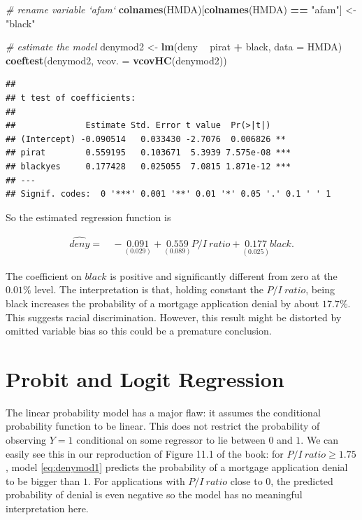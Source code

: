 \documentclass[]{book}
\newenvironment{Shaded}{\begin{snugshade}}{\end{snugshade}}
\newcommand{\KeywordTok}[1]{\textcolor[rgb]{0.13,0.29,0.53}{\textbf{#1}}}
\newcommand{\DataTypeTok}[1]{\textcolor[rgb]{0.13,0.29,0.53}{#1}}
\newcommand{\StringTok}[1]{\textcolor[rgb]{0.31,0.60,0.02}{#1}}
\newcommand{\CommentTok}[1]{\textcolor[rgb]{0.56,0.35,0.01}{\textit{#1}}}
\newcommand{\OperatorTok}[1]{\textcolor[rgb]{0.81,0.36,0.00}{\textbf{#1}}}
\newcommand{\NormalTok}[1]{#1}
\theoremstyle{definition}
\theoremstyle{definition}
\theoremstyle{definition}
\theoremstyle{remark}
\begin{document}
\begin{Shaded}
\begin{Highlighting}[]
\CommentTok{# rename variable `afam`}
\KeywordTok{colnames}\NormalTok{(HMDA)[}\KeywordTok{colnames}\NormalTok{(HMDA) }\OperatorTok{==}\StringTok{ "afam"}\NormalTok{] <-}\StringTok{ "black"}

\CommentTok{# estimate the model}
\NormalTok{denymod2 <-}\StringTok{ }\KeywordTok{lm}\NormalTok{(deny }\OperatorTok{~}\StringTok{ }\NormalTok{pirat }\OperatorTok{+}\StringTok{ }\NormalTok{black, }\DataTypeTok{data =}\NormalTok{ HMDA)}
\KeywordTok{coeftest}\NormalTok{(denymod2, }\DataTypeTok{vcov. =} \KeywordTok{vcovHC}\NormalTok{(denymod2))}
\end{Highlighting}
\end{Shaded}

\begin{verbatim}
## 
## t test of coefficients:
## 
##              Estimate Std. Error t value  Pr(>|t|)    
## (Intercept) -0.090514   0.033430 -2.7076  0.006826 ** 
## pirat        0.559195   0.103671  5.3939 7.575e-08 ***
## blackyes     0.177428   0.025055  7.0815 1.871e-12 ***
## ---
## Signif. codes:  0 '***' 0.001 '**' 0.01 '*' 0.05 '.' 0.1 ' ' 1
\end{verbatim}

So the estimated regression function is

\begin{align}
  \widehat{deny} =& \, -\underset{(0.029)}{0.091} + \underset{(0.089)}{0.559} P/I \ ratio + \underset{(0.025)}{0.177} black. \label{eq:denymod2}
\end{align}

The coefficient on \(black\) is positive and significantly different
from zero at the \(0.01\%\) level. The interpretation is that, holding
constant the \(P/I \ ratio\), being black increases the probability of a
mortgage application denial by about \(17.7\%\). This suggests racial
discrimination. However, this result might be distorted by omitted
variable bias so this could be a premature conclusion.

\section{Probit and Logit Regression}\label{probit-and-logit-regression}

The linear probability model has a major flaw: it assumes the
conditional probability function to be linear. This does not restrict
the probability of observing \(Y=1\) conditional on some regressor to
lie between \(0\) and \(1\). We can easily see this in our reproduction
of Figure 11.1 of the book: for \(P/I \ ratio \geq 1.75\), model
\eqref{eq:denymod1} predicts the probability of a mortgage application
denial to be bigger than \(1\). For applications with \(P/I \ ratio\)
close to \(0\), the predicted probability of denial is even negative so
the model has no meaningful interpretation here.
\end{document}
